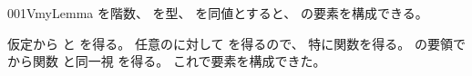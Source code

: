 \documentclass[index]{subfiles}
\begin{document}
\begin{myBlock}{001V}{myLemma}
  を階数、
  を型、
  を同値とすると、
  の要素を構成できる。
\end{myBlock}
\begin{myProof}
  仮定から
  と
  を得る。
  任意のに対して
  を得るので、
  特に関数を得る。
  の要領でから関数
  と同一視
  を得る。
  これで要素を構成できた。
\end{myProof}
\end{document}
